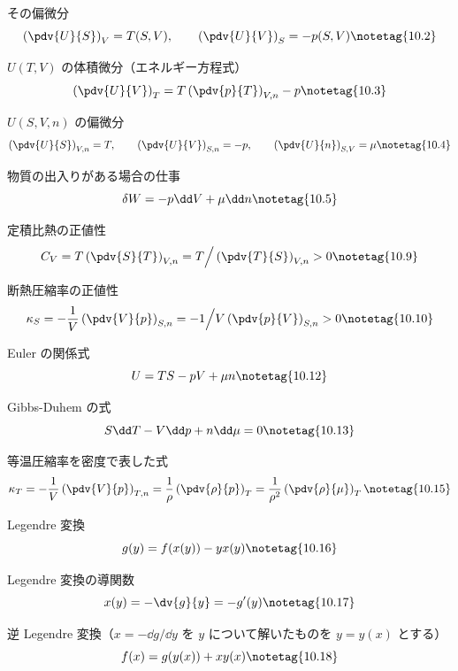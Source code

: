 \documentclass[uplatex,dvipdfmx,a4paper,11pt]{jsarticle}
\begin{document}
\youtenseiri
\begin{noteshikilist}
  \item その偏微分 %
    \[ \left(\pdv{U}{S}\right)_{V} = T(S,V), \qquad \left(\pdv{U}{V}\right)_{S} = -p(S,V) \notetag{10.2} \]
  \item $U(T,V)$ の体積微分（エネルギー方程式） %
    \[ \left(\pdv{U}{V}\right)_{T} = T\left(\pdv{p}{T}\right)_{V,n} - p \notetag{10.3} \]
  \item $U(S,V,n)$ の偏微分 %
    \[ \left(\pdv{U}{S}\right)_{V,n} = T, \qquad \left(\pdv{U}{V}\right)_{S,n} = -p, \qquad \left(\pdv{U}{n}\right)_{S,V} = \mu \notetag{10.4} \]
  \item 物質の出入りがある場合の仕事 %
    \[ \delta W = -p\dd V + \mu\dd n \notetag{10.5} \]
  \item 定積比熱の正値性 %
    \[ C_{V} = T\left(\pdv{S}{T}\right)_{V,n} = T\Big/\left(\pdv{T}{S}\right)_{V,n} > 0 \notetag{10.9} \]
  \item 断熱圧縮率の正値性 %
    \[ \kappa_{S} = -\frac{1}{V}\left(\pdv{V}{p}\right)_{S,n} = -1\Big/V\left(\pdv{p}{V}\right)_{S,n} > 0 \notetag{10.10} \]
  \item Euler の関係式 %
    \[ U = TS - pV + \mu n \notetag{10.12} \]
  \item Gibbs-Duhem の式 %
    \[ S\dd T - V\dd p + n\dd\mu = 0 \notetag{10.13} \]
  \item 等温圧縮率を密度で表した式 %
    \[ \kappa_{T} = -\frac{1}{V}\left(\pdv{V}{p}\right)_{T,n} = \frac{1}{\rho}\left(\pdv{\rho}{p}\right)_{T} = \frac{1}{\rho^{2}}\left(\pdv{\rho}{\mu}\right)_{T} \notetag{10.15} \]
  \item Legendre 変換 %
    \[ g(y) = f(x(y)) - yx(y) \notetag{10.16} \]
  \item Legendre 変換の導関数 %
    \[ x(y) = -\dv{g}{y} = -g'(y) \notetag{10.17} \]
  \item 逆 Legendre 変換（$x = -\dd g/\dd y$ を $y$ について解いたものを $y = y(x)$ とする） %
    \[ f(x) = g(y(x)) + xy(x) \notetag{10.18} \]
\end{noteshikilist}
\end{document}
